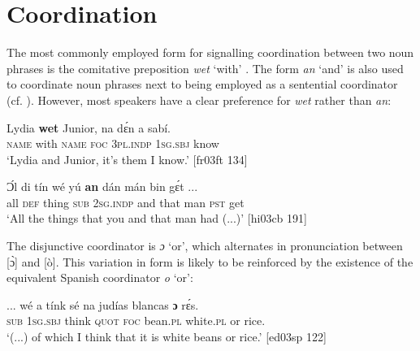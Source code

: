 \section{Coordination}\label{sec:5.5}

The most commonly employed form for signalling coordination between two noun phrases is the comitative preposition \textit{wet} ‘with’ . The form \textit{an} ‘and’ is also used to coordinate noun phrases  next to being employed as a sentential coordinator (cf. ). However, most speakers have a clear preference for \textit{wet} rather than \textit{an}: 


\ea%
    \label{ex:key:297}
    \gll Lydia  \textbf{wet}    Junior,  na  dɛ́n    a    sabí.\\
\textsc{name}  with    \textsc{name}  \textsc{foc}  \textsc{3pl.indp}  \textsc{1sg.sbj}  know\\

\glt ‘Lydia and Junior, it’s them I know.’ [fr03ft 134]
\z


\ea%
    \label{ex:key:298}
    \gll Ɔ́l  di  tín    wé  yú    \textbf{an}  dán  mán    bin  gɛ́t \op...\cp{}\\
all  \textsc{def}  thing  \textsc{sub}  \textsc{2sg.indp}  and  that  man    \textsc{pst}  get\\

\glt ‘All the things that you and that man had (...)’ [hi03cb 191]
\z

The disjunctive coordinator is \textit{ɔ} ‘or’, which alternates in pronunciation between [ɔ̀] and [ò]. This variation in form is likely to be reinforced by the existence of the equivalent Spanish coordinator \textit{o} ‘or’:


\ea%
    \label{ex:key:299}
    \gll \op...\cp{}  wé  a    tínk    sé    na  judías  blancas  \textbf{ɔ}  rɛ́s.\\
 {}  \textsc{sub}  \textsc{1sg.sbj}  think  \textsc{quot}    \textsc{foc}  bean.\textsc{pl}  white.\textsc{pl}  or  rice.\\

\glt ‘(...) of which I think that it is white beans or rice.’ [ed03sp 122]
\z


